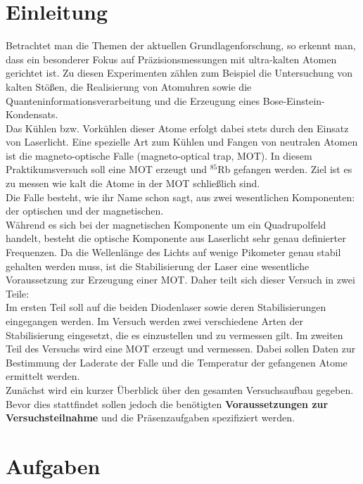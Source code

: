 \documentclass[
class=book,
accentcolor=1b,
custommargins=geometry,
fontsize=11pt,
thesis={type=Versuchsanleitung},
ruledheaders=all,
headline=false,
instbox=false,
marginpar=false,
title=small,
ignore-missing-data=true,
twoside=false,
pdfa=false %
]{apqpub}
\begin{document}
\section{Einleitung}

Betrachtet man die Themen der aktuellen Grundlagenforschung, so erkennt man, dass ein besonderer Fokus auf
Präzisionsmessungen mit ultra-kalten Atomen gerichtet ist. Zu diesen Experimenten zählen zum Beispiel die Untersuchung von kalten Stößen, die Realisierung von Atomuhren sowie die Quanteninformationsverarbeitung und
die Erzeugung eines Bose-Einstein-Kondensats.\\
Das Kühlen bzw. Vorkühlen dieser Atome erfolgt dabei stets durch den Einsatz von Laserlicht. Eine spezielle Art
zum Kühlen und Fangen von neutralen Atomen ist die magneto-optische Falle (magneto-optical trap, MOT). In
diesem Praktikumsversuch soll eine MOT erzeugt und $^{85}$Rb gefangen werden. Ziel ist es zu messen wie kalt die
Atome in der MOT schließlich sind.\\
Die Falle besteht, wie ihr Name schon sagt, aus zwei wesentlichen Komponenten: der optischen und der magnetischen.\\
Während es sich bei der magnetischen Komponente um ein Quadrupolfeld handelt, besteht die optische Komponente
aus Laserlicht sehr genau definierter Frequenzen. Da die Wellenlänge des Lichts auf wenige Pikometer genau stabil
gehalten werden muss, ist die Stabilisierung der Laser eine wesentliche Voraussetzung zur Erzeugung einer MOT.
Daher teilt sich dieser Versuch in zwei Teile:\\
Im ersten Teil soll auf die beiden Diodenlaser sowie deren Stabilisierungen eingegangen werden. Im Versuch werden
zwei verschiedene Arten der Stabilisierung eingesetzt, die es einzustellen und zu vermessen gilt. Im zweiten
Teil des Versuchs wird eine MOT erzeugt und vermessen. Dabei sollen Daten zur Bestimmung der Laderate der
Falle und die Temperatur der gefangenen Atome ermittelt werden.\\
Zunächst wird ein kurzer Überblick über den gesamten Versuchsaufbau gegeben.\\ 
Bevor dies stattfindet sollen jedoch die benötigten \textbf{Voraussetzungen zur Versuchsteilnahme} und die Präsenzaufgaben spezifiziert werden. 

\newpage

\section{Aufgaben}
\end{document}
